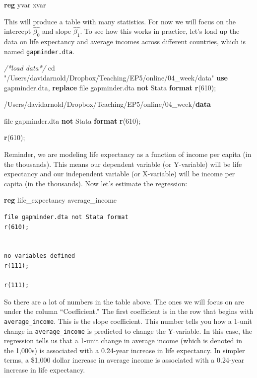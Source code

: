 \documentclass[
]{book}
\newenvironment{Shaded}{\begin{snugshade}}{\end{snugshade}}
\newcommand{\CommentTok}[1]{\textcolor[rgb]{0.56,0.35,0.01}{\textit{#1}}}
\newcommand{\FunctionTok}[1]{\textcolor[rgb]{0.13,0.29,0.53}{\textbf{#1}}}
\newcommand{\KeywordTok}[1]{\textcolor[rgb]{0.13,0.29,0.53}{\textbf{#1}}}
\newcommand{\NormalTok}[1]{#1}
\newcommand{\StringTok}[1]{\textcolor[rgb]{0.31,0.60,0.02}{#1}}
\begin{document}
\begin{Shaded}
\begin{Highlighting}[]
\KeywordTok{reg}\NormalTok{ yvar xvar}
\end{Highlighting}
\end{Shaded}

This will produce a table with many statistics. For now we will focus on the intercept \(\hat{\beta_0}\) and slope \(\hat{\beta_1}\). To see how this works in practice, let's load up the data on life expectancy and average incomes across different countries, which is named \texttt{gapminder.dta}.

\begin{Shaded}
\begin{Highlighting}[]
\CommentTok{/*load data*/} 
\NormalTok{cd }\StringTok{"/Users/davidarnold/Dropbox/Teaching/EP5/online/04\_week/data"}
\KeywordTok{use}\NormalTok{ gapminder.dta, }\KeywordTok{replace} 
\NormalTok{file gapminder.dta }\KeywordTok{not}\NormalTok{ Stata }\KeywordTok{format}
\FunctionTok{r}\NormalTok{(610);}


\NormalTok{/Users/davidarnold/Dropbox/Teaching/EP5/online/04\_week/}\KeywordTok{data}

\NormalTok{file gapminder.dta }\KeywordTok{not}\NormalTok{ Stata }\KeywordTok{format}
\FunctionTok{r}\NormalTok{(610);}

\FunctionTok{r}\NormalTok{(610);}
\end{Highlighting}
\end{Shaded}

Reminder, we are modeling life expectancy as a function of income per capita (in the thousands). This means our dependent variable (or Y-variable) will be life expectancy and our independent variable (or X-variable) will be income per capita (in the thousands). Now let's estimate the regression:

\begin{Shaded}
\begin{Highlighting}[]
\KeywordTok{reg}\NormalTok{ life\_expectancy average\_income}
\end{Highlighting}
\end{Shaded}

\begin{verbatim}
file gapminder.dta not Stata format
r(610);


no variables defined
r(111);

r(111);
\end{verbatim}

So there are a lot of numbers in the table above. The ones we will focus on are under the column ``Coefficient.'' The first coefficient is in the row that begins with \texttt{average\_income}. This is the slope coefficient. This number tells you how a 1-unit change in \texttt{average\_income} is predicted to change the Y-variable. In this case, the regression tells us that a 1-unit change in average income (which is denoted in the 1,000s) is associated with a 0.24-year increase in life expectancy. In simpler terms, a \$1,000 dollar increase in average income is associated with a 0.24-year increase in life expectancy.
\end{document}
